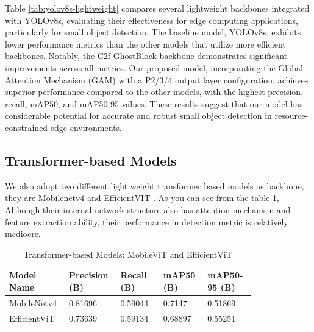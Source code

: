 \documentclass[10pt]{article}
\begin{document}
    Table \ref{tab:yolov8s-lightweight} compares several lightweight backbones integrated with YOLOv8s, evaluating their effectiveness for edge computing applications, particularly for small object detection. The baseline model, YOLOv8s, exhibits lower performance metrics than the other models that utilize more efficient backbones. Notably, the C2f-GhostBlock backbone demonstrates significant improvements across all metrics. Our proposed model, incorporating the Global Attention Mechanism (GAM) with a P2/3/4 output layer configuration, achieves superior performance compared to the other models, with the highest precision, recall, mAP50, and mAP50-95 values. These results suggest that our model has considerable potential for accurate and robust small object detection in resource-constrained edge environments.
\subsection{Transformer-based Models}
We also adopt two different light weight transformer based models as backbone, they are Mobilenetv4\cite{mobilenetv4_bottleneck} and EfficientVIT\cite{efficient} . As you can see from the table \ref{tab:transformer-models}, Although their internal network structure also has attention mechanism and feature extraction ability, their performance in detection metric is relatively mediocre.

    \begin{table}[]
        \centering
        \caption{Transformer-based Models: MobileViT and EfficientViT}
        \label{tab:transformer-models}
        \begin{tabular}{p{0.16\linewidth}p{0.16\linewidth}p{0.16\linewidth}p{0.16\linewidth}p{0.16\linewidth}}
        \toprule
        Model Name           & Precision (B) & Recall (B) & mAP50 (B) & mAP50-95 (B) \\ \midrule
        MobileNetv4 & 0.81696       & 0.59044    & 0.7147    & 0.51869      \\
        EfficientViT & 0.73639     & 0.59134   & 0.68897    & 0.55251     \\ \bottomrule
        \end{tabular}
        \end{table}
\end{document}
